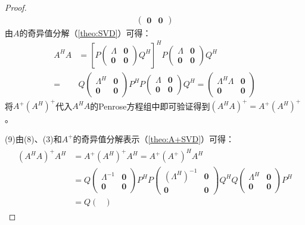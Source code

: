 \begin{proof}
\begin{align*}
\begin{pmatrix}
			\mathbf{0} & \mathbf{0}
		\end{pmatrix}
	\end{align*}
	由$A$的奇异值分解（\cref{theo:SVD}）可得：
	\begin{align*}
		A^HA&=\left[P
		\begin{pmatrix}
			\varLambda & \mathbf{0} \\
			\mathbf{0} & \mathbf{0}
		\end{pmatrix}Q^H\right]^HP
		\begin{pmatrix}
			\varLambda & \mathbf{0} \\
			\mathbf{0} & \mathbf{0}
		\end{pmatrix}Q^H \\
		=&Q
		\begin{pmatrix}
			\varLambda^H & \mathbf{0} \\
			\mathbf{0} & \mathbf{0}
		\end{pmatrix}
		P^HP
		\begin{pmatrix}
			\varLambda & \mathbf{0} \\
			\mathbf{0} & \mathbf{0}
		\end{pmatrix}Q^H
		=\begin{pmatrix}
			\varLambda^H\varLambda & \mathbf{0} \\
			\mathbf{0} & \mathbf{0}
		\end{pmatrix}
	\end{align*}
	将$A^+(A^H)^+$代入$A^HA$的Penrose方程组中即可验证得到$(A^HA)^+=A^+(A^H)^+$。\par
	(9)由(8)、(3)和$A^+$的奇异值分解表示（\cref{theo:A+SVD}）可得：
	\begin{gather*}
		\begin{aligned}
			(A^HA)^+A^H
			&=A^+(A^H)^+A^H
			=A^+(A^+)^HA^H \\
			&=Q
			\begin{pmatrix}
				\varLambda^{-1} & \mathbf{0} \\
				\mathbf{0} & \mathbf{0}
			\end{pmatrix}
			P^HP
			\begin{pmatrix}
				(\varLambda^H)^{-1} & \mathbf{0} \\
				\mathbf{0} & \mathbf{0}
			\end{pmatrix}
			Q^HQ
			\begin{pmatrix}
				\varLambda^H & \mathbf{0} \\
				\mathbf{0} & \mathbf{0}
			\end{pmatrix}
			P^H \\
			&=Q
			\begin{pmatrix}

\end{pmatrix}
\end{aligned}
\end{gather*}
\end{proof}
